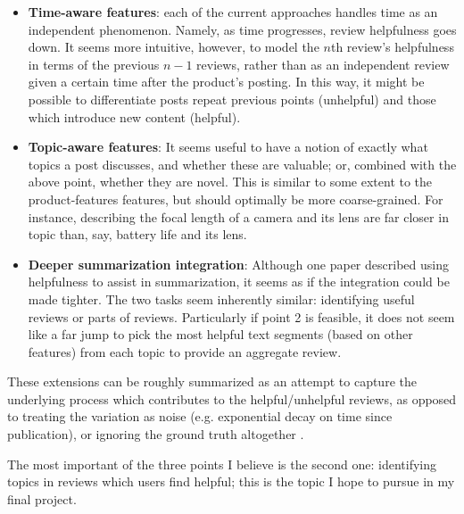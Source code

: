 \documentclass[12pt,letterpaper]{article}
\begin{document}
\begin{itemize}
	\item {\bf Time-aware features}: each of the current approaches handles time as an independent phenomenon.
		Namely, as time progresses, review helpfulness goes down.
		It seems more intuitive, however, to model the $n$th review's helpfulness in terms of the previous $n-1$
			reviews, rather than as an independent review given a certain time after the product's posting.
		In this way, it might be possible to differentiate posts repeat previous points (unhelpful)
			and those which introduce new content (helpful).
	\item {\bf Topic-aware features}: It seems useful to have a notion of exactly
			what topics a post discusses, and whether these are valuable; or, combined with the above point, whether
			they are novel.
		This is similar to some extent to the product-features features, but should optimally be more coarse-grained.
		For instance, describing the focal length of a camera and its lens are far closer in topic than, say, battery
			life and its lens.
	\item {\bf Deeper summarization integration}: Although one paper described using helpfulness to assist in
			summarization, it seems as if the integration could be made tighter.
		The two tasks seem inherently similar: identifying useful reviews or parts of reviews.
		Particularly if point 2 is feasible, it does not seem like a far jump to pick the most helpful text segments
			(based on other features) from each topic to provide an aggregate review.
\end{itemize}

These extensions can be roughly summarized as an attempt to capture the underlying process which contributes to
	the helpful/unhelpful reviews, as opposed to treating the variation as noise (e.g. exponential decay on
	time since publication), or ignoring the ground truth altogether \cite{2007liu-helpfulness}.

The most important of the three points I believe is the second one: identifying topics in 
	reviews which users find helpful; this is the topic I hope to pursue in my final project.




\end{document}
